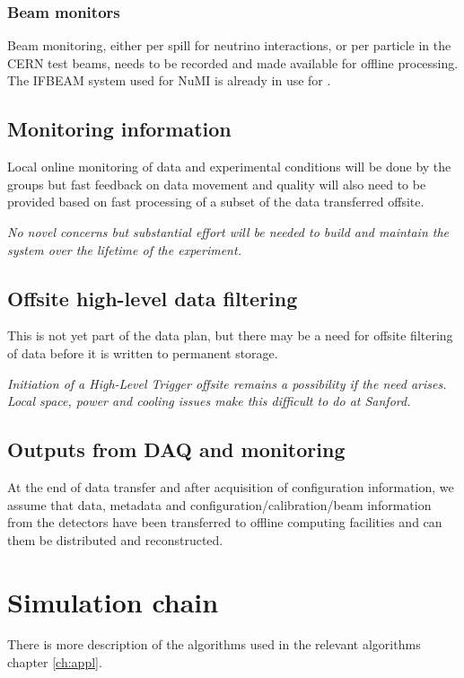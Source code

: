 \documentclass[../main-v1.tex]{subfiles}
\begin{document}

\subsubsection{Beam monitors}
Beam monitoring, either per spill for neutrino interactions, or per particle in the CERN test beams, needs to be recorded and made available for offline processing. 
The IFBEAM system used for NuMI is already in use for .

\subsection{Monitoring information}
Local online monitoring of data and experimental conditions will be done by the  groups but fast feedback on data movement and quality will also need to be provided based on fast processing of a subset of the data transferred offsite. 

{\it No novel concerns but substantial effort will be needed to build and maintain the system over the lifetime of the experiment.}

\subsection{Offsite high-level data filtering}
This is not yet part of the data plan, but there may be a need for offsite filtering of data before it is written to permanent storage. 

{\it  Initiation of a High-Level Trigger offsite remains a possibility if the need arises. Local space, power and cooling issues make this difficult to do at Sanford.}

\subsection{Outputs from DAQ and monitoring}
At the end of data transfer and after acquisition of configuration information,  we assume that data, metadata and configuration/calibration/beam information from the detectors have been transferred to offline computing facilities and can them be distributed and reconstructed. 




\section{Simulation chain}

There is more description of the algorithms used in the relevant algorithms chapter \ref{ch:appl}.  
\end{document}
